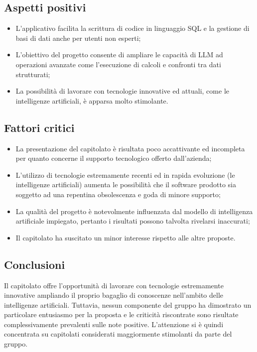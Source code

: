 \subsection{Aspetti positivi}
\begin{itemize}
    \setlength\itemsep{0em}
    \item L'applicativo facilita la scrittura di codice in linguaggio SQL e la gestione di basi di dati anche per utenti non esperti;
    \item L'obiettivo del progetto consente di ampliare le capacità di LLM ad operazioni avanzate come l'esecuzione di calcoli e confronti tra dati strutturati;
    \item La possibilità di lavorare con tecnologie innovative ed attuali, come le intelligenze artificiali, è apparsa molto stimolante.
\end{itemize}

\subsection{Fattori critici}
\begin{itemize}
    \setlength\itemsep{0em}
    \item La presentazione del capitolato è risultata poco accattivante ed incompleta per quanto concerne il supporto tecnologico offerto dall'azienda;
    \item L'utilizzo di tecnologie estremamente recenti ed in rapida evoluzione (le intelligenze artificiali) aumenta le possibilità che il software prodotto sia soggetto ad una repentina obsolescenza e goda di minore supporto;
    \item La qualità del progetto è notevolmente influenzata dal modello di intelligenza artificiale impiegato, pertanto i risultati possono talvolta rivelarsi inaccurati;
    \item Il capitolato ha suscitato un minor interesse rispetto alle altre proposte.
\end{itemize}

\subsection{Conclusioni}
Il capitolato offre l'opportunità di lavorare con tecnologie estremamente innovative ampliando il proprio bagaglio di conoscenze nell'ambito delle intelligenze artificiali. Tuttavia, nessun componente del gruppo ha dimostrato un particolare entusiasmo per la proposta e le criticità riscontrate sono risultate complessivamente prevalenti sulle note positive. L'attenzione si è quindi concentrata su capitolati considerati maggiormente stimolanti da parte del gruppo.
